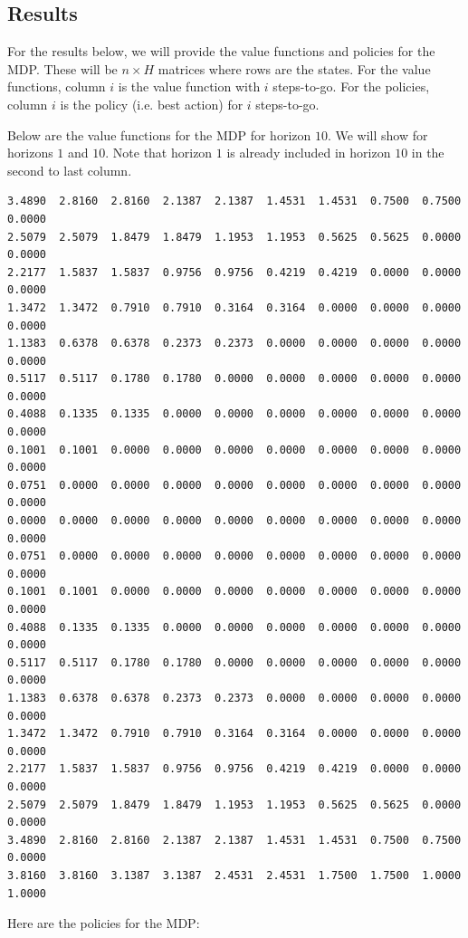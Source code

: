 \documentclass[paper=a4, fontsize=11pt]{scrartcl}
\begin{document}
\subsection{Results}

For the results below, we will provide the value functions and policies for the MDP. These will be $n \times H$ matrices where rows are the states. For the value functions, column $i$ is the value function with $i$ steps-to-go. For the policies, column $i$ is the policy (i.e. best action) for $i$ steps-to-go.

Below are the value functions for the MDP for horizon $10$. We will show for horizons $1$ and $10$. Note that horizon $1$ is already included in horizon $10$ in the second to last column.

\begin{verbatim}
3.4890  2.8160  2.8160  2.1387  2.1387  1.4531  1.4531  0.7500  0.7500  0.0000
2.5079  2.5079  1.8479  1.8479  1.1953  1.1953  0.5625  0.5625  0.0000  0.0000
2.2177  1.5837  1.5837  0.9756  0.9756  0.4219  0.4219  0.0000  0.0000  0.0000
1.3472  1.3472  0.7910  0.7910  0.3164  0.3164  0.0000  0.0000  0.0000  0.0000
1.1383  0.6378  0.6378  0.2373  0.2373  0.0000  0.0000  0.0000  0.0000  0.0000
0.5117  0.5117  0.1780  0.1780  0.0000  0.0000  0.0000  0.0000  0.0000  0.0000
0.4088  0.1335  0.1335  0.0000  0.0000  0.0000  0.0000  0.0000  0.0000  0.0000
0.1001  0.1001  0.0000  0.0000  0.0000  0.0000  0.0000  0.0000  0.0000  0.0000
0.0751  0.0000  0.0000  0.0000  0.0000  0.0000  0.0000  0.0000  0.0000  0.0000
0.0000  0.0000  0.0000  0.0000  0.0000  0.0000  0.0000  0.0000  0.0000  0.0000
0.0751  0.0000  0.0000  0.0000  0.0000  0.0000  0.0000  0.0000  0.0000  0.0000
0.1001  0.1001  0.0000  0.0000  0.0000  0.0000  0.0000  0.0000  0.0000  0.0000
0.4088  0.1335  0.1335  0.0000  0.0000  0.0000  0.0000  0.0000  0.0000  0.0000
0.5117  0.5117  0.1780  0.1780  0.0000  0.0000  0.0000  0.0000  0.0000  0.0000
1.1383  0.6378  0.6378  0.2373  0.2373  0.0000  0.0000  0.0000  0.0000  0.0000
1.3472  1.3472  0.7910  0.7910  0.3164  0.3164  0.0000  0.0000  0.0000  0.0000
2.2177  1.5837  1.5837  0.9756  0.9756  0.4219  0.4219  0.0000  0.0000  0.0000
2.5079  2.5079  1.8479  1.8479  1.1953  1.1953  0.5625  0.5625  0.0000  0.0000
3.4890  2.8160  2.8160  2.1387  2.1387  1.4531  1.4531  0.7500  0.7500  0.0000
3.8160  3.8160  3.1387  3.1387  2.4531  2.4531  1.7500  1.7500  1.0000  1.0000
\end{verbatim}

Here are the policies for the MDP:
\end{document}
